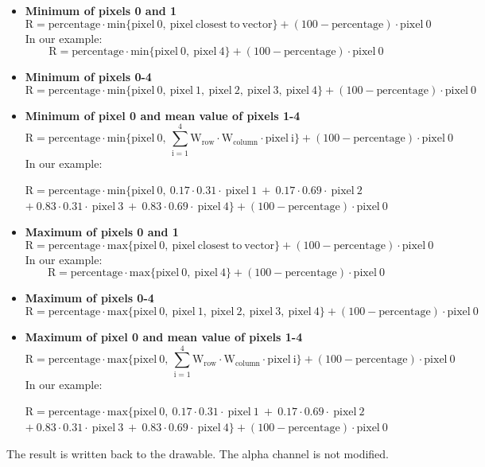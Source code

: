 \documentclass[a4paper]{article}
\begin{document}
\begin{itemize}

	\item \textbf{Minimum of pixels 0 and 1}
		$$\mathrm{R} = \mathrm{percentage} \cdot \mathrm{min}\{\mathrm{pixel\ 0,\ pixel\ closest\ to\ vector}\} + \left( 100 - \mathrm{percentage} \right) \cdot \mathrm{pixel\ 0}$$
		In our example:
		$$\mathrm{R} = \mathrm{percentage} \cdot \mathrm{min}\{\mathrm{pixel\ 0,\ pixel\ 4}\} + \left( 100 - \mathrm{percentage} \right) \cdot \mathrm{pixel\ 0}$$

	\item \textbf{Minimum of pixels 0-4}
		$$\mathrm{R} = \mathrm{percentage} \cdot \mathrm{min}\{\mathrm{pixel\ 0,\ pixel\ 1,\ pixel\ 2,\ pixel\ 3,\ pixel\ 4}\} + \left( 100 - \mathrm{percentage} \right) \cdot \mathrm{pixel\ 0}$$

	\item \textbf{Minimum of pixel 0 and mean value of pixels 1-4}
		$$\mathrm{R} = \mathrm{percentage} \cdot \mathrm{min}\{\mathrm{pixel\ 0,\ \sum_{i=1}^4 W_{row} \cdot W_{column} \cdot pixel\ i}\} + \left( 100 - \mathrm{percentage} \right) \cdot \mathrm{pixel\ 0}$$
		In our example:

		$\mathrm{R} = \mathrm{percentage} \cdot \mathrm{min}\{\mathrm{pixel\ 0,\ 0.17 \cdot 0.31 \cdot\ pixel\ 1\ +\ 0.17 \cdot 0.69 \cdot\ pixel\ 2\ }$ \\
		$\mathrm{+\ 0.83 \cdot 0.31 \cdot\ pixel\ 3\ +\ 0.83 \cdot 0.69 \cdot\ pixel\ 4}\} + \left( 100 - \mathrm{percentage} \right) \cdot \mathrm{pixel\ 0}$

	\item \textbf{Maximum of pixels 0 and 1}
		$$\mathrm{R} = \mathrm{percentage} \cdot \mathrm{max}\{\mathrm{pixel\ 0,\ pixel\ closest\ to\ vector}\} + \left( 100 - \mathrm{percentage} \right) \cdot \mathrm{pixel\ 0}$$
		In our example:
		$$\mathrm{R} = \mathrm{percentage} \cdot \mathrm{max}\{\mathrm{pixel\ 0,\ pixel\ 4}\} + \left( 100 - \mathrm{percentage} \right) \cdot \mathrm{pixel\ 0}$$

	\item \textbf{Maximum of pixels 0-4}
		$$\mathrm{R} = \mathrm{percentage} \cdot \mathrm{max}\{\mathrm{pixel\ 0,\ pixel\ 1,\ pixel\ 2,\ pixel\ 3,\ pixel\ 4}\} + \left( 100 - \mathrm{percentage} \right) \cdot \mathrm{pixel\ 0}$$

	\item \textbf{Maximum of pixel 0 and mean value of pixels 1-4}
		$$\mathrm{R} = \mathrm{percentage} \cdot \mathrm{max}\{\mathrm{pixel\ 0,\ \sum_{i=1}^4 W_{row} \cdot W_{column} \cdot pixel\ i}\} + \left( 100 - \mathrm{percentage} \right) \cdot \mathrm{pixel\ 0}$$
		In our example:

		$\mathrm{R} = \mathrm{percentage} \cdot \mathrm{max}\{\mathrm{pixel\ 0,\ 0.17 \cdot 0.31 \cdot\ pixel\ 1\ +\ 0.17 \cdot 0.69 \cdot\ pixel\ 2\ }$ \\
		$\mathrm{+\ 0.83 \cdot 0.31 \cdot\ pixel\ 3\ +\ 0.83 \cdot 0.69 \cdot\ pixel\ 4}\} + \left( 100 - \mathrm{percentage} \right) \cdot \mathrm{pixel\ 0}$

\end{itemize}

The result is written back to the drawable. The alpha channel is not modified.
\end{document}

